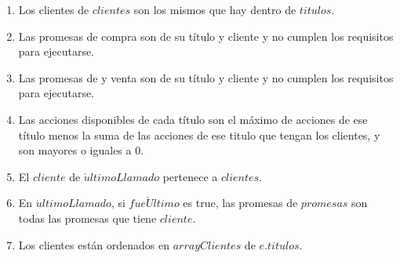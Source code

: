  \begin{enumerate}
 	\item Los clientes de $clientes$ son los mismos que hay dentro de $titulos$.
 	\item Las promesas de compra  son de su t\'itulo y cliente y no cumplen los requisitos para ejecutarse.
 	\item Las promesas de y venta son de su t\'itulo y cliente y no cumplen los requisitos para ejecutarse.
 	\item Las acciones disponibles de cada t\'itulo son el m\'aximo de acciones de ese t\'itulo menos la suma de las acciones de ese titulo que tengan los clientes, y son mayores o iguales a 0.
 	\item El $cliente$ de $\acute{u}ltimoLlamado$ pertenece a $clientes$.
 	\item En $\acute{u}ltimoLlamado$, si $fue\acute{U}ltimo$ es true, las promesas de $promesas$ son todas las promesas que tiene $cliente$.
 	\item Los clientes est\'an ordenados en $arrayClientes$ de $e.titulos$.
  \end{enumerate}
  
